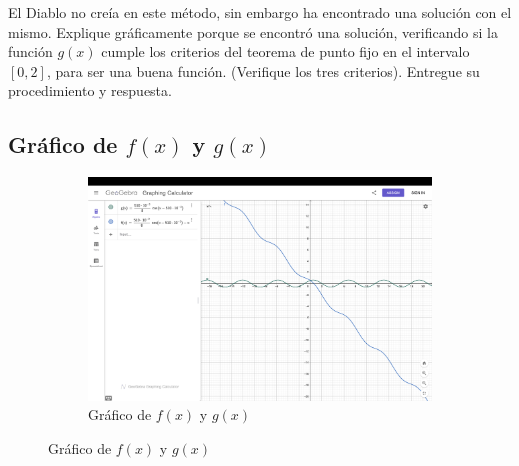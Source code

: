 El Diablo no creía en este método, sin embargo ha encontrado una solución con
el mismo. Explique gráficamente porque se encontró una solución, verificando si
la función $g(x)$ cumple los criterios del teorema de punto fijo en el intervalo
$[0, 2]$, para ser una buena función. (Verifique los tres criterios). Entregue su procedimiento y respuesta. 

\subsection{Gráfico de $f(x)$ y $g(x)$}
\begin{figure}[H]
    \centering
    \begin{subfigure}[b]{\textwidth}
        \centering
        \includegraphics[width=\textwidth]{Figures/0. General/2.1.1.png}
        \caption{Gráfico de $f(x)$ y $g(x)$}
        \label{fig: Grafico de f(x) y g(x)}
    \end{subfigure}
\end{figure}

